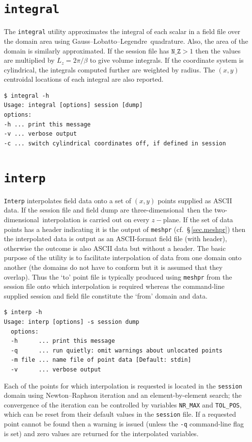 \documentclass[11pt]{report}
\newcommand\twod{two-di\-men\-sion\-al}
\newcommand\threed{three-di\-men\-sion\-al}
\newcommand\GLL{Gauss--Lobatto--Legendre}
\begin{document}
\section{\texttt{integral}}
\label{sec.integral}

The \verb|integral| utility approximates the integral of each scalar
in a field file over the domain area using \GLL\ quadrature.  Also,
the area of the domain is similarly approximated.  If the session file
has $\texttt{N\_Z}>1$ then the values are multiplied by $L_z =
2\pi/\beta$ to give volume integrals.  If the coordinate system is
cylindrical, the integrals computed further are weighted by radius.
The $(x,y)$ centroidal locations of each integral are also reported.

{\small
\begin{verbatim}
$ integral -h
Usage: integral [options] session [dump]
options:
-h ... print this message
-v ... verbose output
-c ... switch cylindrical coordinates off, if defined in session
\end{verbatim}
}
%

\section{\texttt{interp}}
\label{sec.interp}

\verb|Interp| interpolates field data onto a set of $(x,y)$ points
supplied as ASCII data. If the session file and field dump are
\threed\ then the \twod\ interpolation is carried out on every
$z-$plane.  If the set of data points has a header indicating it is
the output of \verb|meshpr| (cf.\ \S\,\ref{sec.meshpr}) then the
interpolated data is output as an ASCII-format field file (with
header), otherwise the outcome is also ASCII data but without a
header.  The basic purpose of the utility is to facilitate
interpolation of data from one domain onto another (the domains do not
have to conform but it is assumed that they overlap).  Thus the `to'
point file is typically produced using \verb|meshpr| from the session
file onto which interpolation is required whereas the command-line
supplied session and field file constitute the `from' domain and
data.
%
{\small
\begin{verbatim}
$ interp -h
Usage: interp [options] -s session dump
  options:
  -h      ... print this message
  -q      ... run quietly: omit warnings about unlocated points
  -m file ... name file of point data [Default: stdin]
  -v      ... verbose output
\end{verbatim}
}
%
Each of the points for which interpolation is requested is located in
the \verb|session| domain using Newton--Raphson iteration and an
element-by-element search; the convergence of the iteration can be
controlled by variables \verb|NR_MAX| and \verb|TOL_POS|, which can be
reset from their default values in the \verb|session| file.  If a
requested point cannot be found then a warning is issued (unless the
\verb|-q| command-line flag is set) and zero values are returned for
the interpolated variables.
\end{document}
